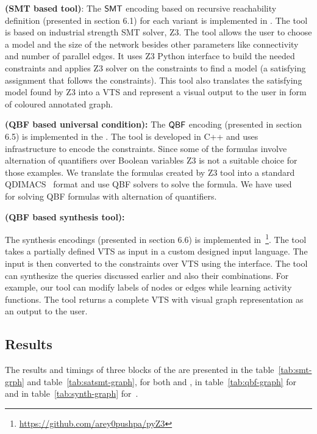 \textbf{{\smttool} (SMT based tool)}:
The $\mathsf{SMT}$ encoding based on recursive reachability definition (presented in section 6.1)  
for each variant is implemented in {\smttool}.
%
The tool is based on industrial strength SMT solver, Z3. 
%
The tool allows the user to choose a model and the size
of the network besides other parameters like connectivity and number of parallel edges. 
%		
It uses Z3 Python interface to build the needed constraints and applies Z3 solver on the constraints to find a model (a satisfying assignment that follows the constraints). 
%
This tool also translates the satisfying model found by Z3 into
a VTS and represent a visual output to the user in form of coloured annotated graph. 
%
%
 

\textbf{{\qbftool} (QBF based universal condition):}
The $\mathsf{QBF}$ encoding (presented in section 6.5) is implemented in the {\qbftool}. 
%
The tool is developed in C++ and uses~\zthree~\cite{z3} infrastructure to encode the constraints.
%
Since some of the formulas involve alternation of quantifiers over Boolean variables Z3 is not a suitable choice for those examples.
%
We translate the formulas created by Z3 tool into a standard
QDIMACS~\cite{qdimacs} format and use QBF solvers to solve the formula. 
%
We have used~\depqbf~\cite{lonsing2010depqbf} for solving QBF formulas with alternation of quantifiers. 

\textbf{{\ourtool} (QBF based synthesis tool):}

The synthesis encodings (presented in section 6.6) is implemented  in~\ourtool\footnote{{\url{https://github.com/arey0pushpa/pyZ3}}}.
%
The tool takes a partially defined VTS as input in a custom designed
input language.
%
The input is then converted to the constraints over VTS using the {\qbftool} interface. 
%
The tool can synthesize the queries discussed earlier and also their combinations.
%
For example, our tool can modify labels of nodes or edges while
learning activity functions.
%
The tool returns a complete VTS with visual graph representation as an output to the user.  

\subsection{Results}
The results and timings of three blocks of the {\vtstool} are presented in the table~\ref{tab:smt-grph} and table~\ref{tab:satsmt-graph}, for both {\sattool} and {\smttool}, in table~\ref{tab:qbf-graph} for {\qbftool} and in table~\ref{tab:synth-graph} for~{\ourtool}.


